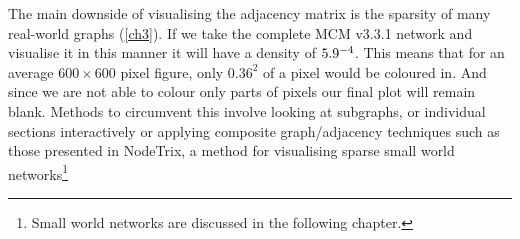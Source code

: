 The main downside of visualising the adjacency matrix is the sparsity of many real-world graphs (\autoref{ch3}). If we take the complete MCM v3.3.1 network \citep{mcmpartA} and visualise it in this manner it will have a density of $5.9 \time 10^{-4}$. This means that for an average $600 \times 600$ pixel figure, only $0.36^2$ of a pixel would be coloured in. And since we are not able to colour only parts of pixels our final plot will remain blank. Methods to circumvent this involve looking at subgraphs, or individual sections interactively or applying composite graph/adjacency techniques such as those presented in NodeTrix, a method for visualising sparse small world networks\footnote{Small world networks are discussed in the following chapter.} \citep{nodetrix}
%



